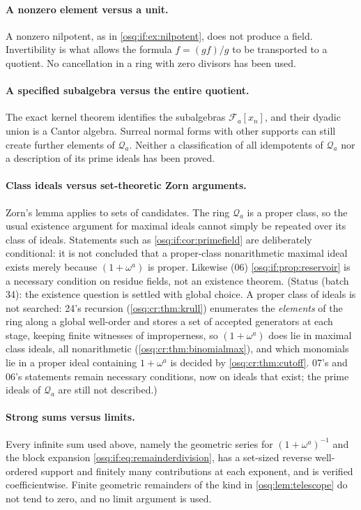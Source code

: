 \documentclass[11pt,letterpaper]{article}
\numberwithin{equation}{section}
\theoremstyle{definition}
\theoremstyle{remark}
\theoremstyle{plain}
\newcommand{\FF}{\mathscr F}         %
\newcommand{\Qa}{\mathcal Q}         %
\begin{document}
\paragraph{A nonzero element versus a unit.} A nonzero nilpotent, as in
\cref{osq:if:ex:nilpotent}, does not produce a field. Invertibility is what allows the
formula $f=(gf)/g$ to be transported to a quotient. No cancellation in a ring with zero
divisors has been used.

\paragraph{A specified subalgebra versus the entire quotient.} The exact kernel theorem
identifies the subalgebras $\FF_a[x_n]$, and their dyadic union is a Cantor algebra.
Surreal normal forms with other supports can still create further elements of $\Qa_a$.
Neither a classification of all idempotents of $\Qa_a$ nor a description of its prime
ideals has been proved.

\paragraph{Class ideals versus set-theoretic Zorn arguments.} Zorn's lemma applies to sets
of candidates. The ring $\Qa_a$ is a proper class, so the usual existence argument for
maximal ideals cannot simply be repeated over its class of ideals. Statements such as
\cref{osq:if:cor:primefield} are deliberately conditional: it is not concluded that a
proper-class nonarithmetic maximal ideal exists merely because $(1+\omega^a)$ is proper.
Likewise (06) \cref{osq:if:prop:reservoir} is a necessary condition on residue fields, not an
existence theorem. (Status (batch 34): the existence question is settled with global choice. A proper class of ideals is not searched: 24's
recursion (\cref{osq:cr:thm:krull}) enumerates the \emph{elements} of the ring along a global well-order and stores a set of accepted generators at
each stage, keeping finite witnesses of improperness, so $(1+\omega^a)$ does lie in maximal class ideals, all nonarithmetic
(\cref{osq:cr:thm:binomialmax}), and which monomials lie in a proper ideal containing $1+\omega^a$ is decided by \cref{osq:cr:thm:cutoff}. 07's and 06's statements
remain necessary conditions, now on ideals that exist; the prime ideals of $\Qa_a$ are still not described.)

\paragraph{Strong sums versus limits.} Every infinite sum used above, namely the geometric
series for $(1+\omega^a)^{-1}$ and the block expansion \eqref{osq:if:eq:remainderdivision},
has a set-sized reverse well-ordered support and finitely many contributions at each
exponent, and is verified coefficientwise. Finite geometric remainders of the kind in
\cref{osq:lem:telescope} do not tend to zero, and no limit argument is used.
\end{document}
